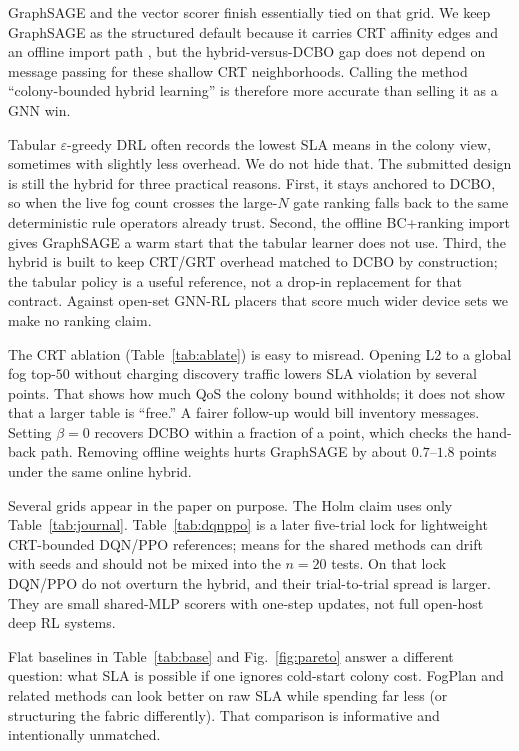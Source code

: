 \documentclass[pdflatex,sn-mathphys-num,iicol]{sn-jnl}
\begin{document}
GraphSAGE and the vector scorer finish essentially tied on that grid. We keep
GraphSAGE as the structured default because it carries CRT affinity edges and
an offline import path
\cite{hamilton_graphsage2017,xu_gin_iclr2019,ross_aistats2011_dagger}, but the
hybrid-versus-DCBO gap does not depend on message passing for these shallow
CRT neighborhoods. Calling the method ``colony-bounded hybrid learning'' is
therefore more accurate than selling it as a GNN win.

Tabular $\varepsilon$-greedy DRL often records the lowest SLA means in the
colony view, sometimes with slightly less overhead. We do not hide that. The
submitted design is still the hybrid for three practical reasons. First, it
stays anchored to DCBO, so when the live fog count crosses the large-$N$ gate
ranking falls back to the same deterministic rule operators already trust.
Second, the offline BC+ranking import gives GraphSAGE a warm start that the
tabular learner does not use. Third, the hybrid is built to keep CRT/GRT
overhead matched to DCBO by construction; the tabular policy is a useful
reference, not a drop-in replacement for that contract. Against open-set
GNN-RL placers that score much wider device sets
\cite{lera_jsup2024_gnn,chen_tmc2024_dgddpg} we make no ranking claim.

The CRT ablation (Table~\ref{tab:ablate}) is easy to misread. Opening L2 to a
global fog top-$50$ without charging discovery traffic lowers SLA violation by
several points. That shows how much QoS the colony bound withholds; it does not
show that a larger table is ``free.'' A fairer follow-up would bill inventory
messages. Setting $\beta{=}0$ recovers DCBO within a fraction of a point, which
checks the hand-back path. Removing offline weights hurts GraphSAGE by about
$0.7$--$1.8$ points under the same online hybrid.

Several grids appear in the paper on purpose. The Holm claim uses only
Table~\ref{tab:journal}. Table~\ref{tab:dqnppo} is a later five-trial lock for
lightweight CRT-bounded DQN/PPO references; means for the shared methods can
drift with seeds and should not be mixed into the $n{=}20$ tests. On that lock
DQN/PPO do not overturn the hybrid, and their trial-to-trial spread is larger.
They are small shared-MLP scorers with one-step updates, not full open-host
deep RL systems.

Flat baselines in Table~\ref{tab:base} and Fig.~\ref{fig:pareto} answer a
different question: what SLA is possible if one ignores cold-start colony cost.
FogPlan and related methods can look better on raw SLA while spending far less
(or structuring the fabric differently). That comparison is informative and
intentionally unmatched.
\end{document}
